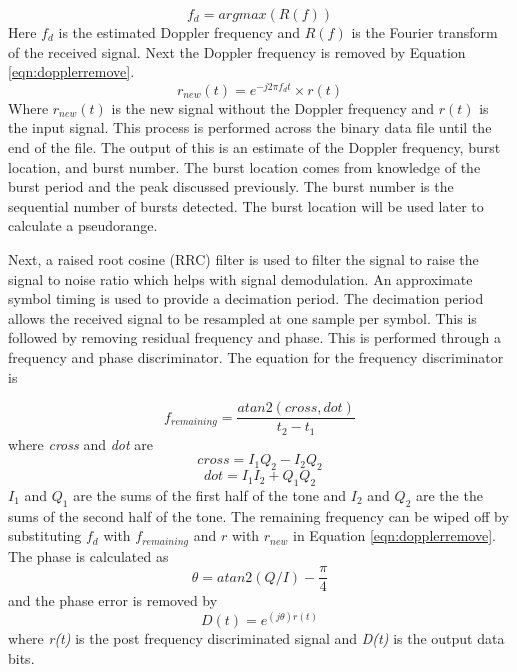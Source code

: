 \documentclass[12pt]{report}
\begin{document}
\begin{equation}
    f_d = argmax(R(f))
    \label{eqn:firstdopplerestimate}
\end{equation}
Here $f_d$ is the estimated Doppler frequency and $R(f)$ is the Fourier transform of the received signal. Next the Doppler frequency is removed by Equation \ref{eqn:dopplerremove}.
\begin{equation}
    r_{new}(t) = e^{-j2\pi f_d t} \times r(t)
    \label{eqn:dopplerremove}
\end{equation}
Where $r_{new}(t)$ is the new signal without the Doppler frequency and $r(t)$ is the input signal. This process is performed across the binary data file until the end of the file. The output of this is an estimate of the Doppler frequency, burst location, and burst number. The burst location comes from knowledge of the burst period and the peak discussed previously. The burst number is the sequential number of bursts detected. The burst location will be used later to calculate a pseudorange. 

Next, a raised root cosine (RRC) filter is used to filter the signal to raise the signal to noise ratio which helps with signal demodulation. An approximate symbol timing is used to provide a decimation period. The decimation period allows the received signal to be resampled at one sample per symbol. This is followed by removing residual frequency and phase. This is performed through a frequency and phase discriminator. The equation for the frequency discriminator is 

\begin{equation}
    f_{remaining} = \frac{atan2(cross,dot)}{t_2 - t_1}
    \label{eqn:freqdisc}
\end{equation}
where \textit{cross} and \textit{dot} are 
\begin{equation}
    cross = I_1Q_2 - I_2Q_2
\end{equation}
\begin{equation}
    dot = I_1I_2 + Q_1Q_2
\end{equation}
 $I_1$ and $Q_1$ are the sums of the first half of the tone and $I_2$ and $Q_2$ are the the sums of the second half of the tone. The remaining frequency can be wiped off by substituting $f_d$ with $f_{remaining}$ and $r$ with $r_{new}$ in Equation \ref{eqn:dopplerremove}. The phase is calculated as 
\begin{equation}
    \theta = atan2(Q/I)-\frac{\pi}{4}
\end{equation}
and the phase error is removed by 
\begin{equation}
    D(t) = e^{(j\theta)r(t)}
\end{equation}
where \textit{r(t)} is the post frequency discriminated signal and \textit{D(t)} is the output data bits.
\end{document}
